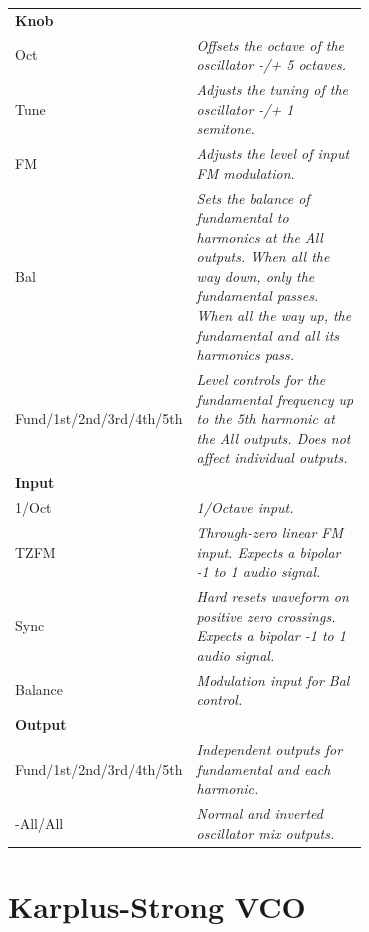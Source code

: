 \documentclass[11pt]{book}
\begin{document}
\begin{table}[ht]
\small
\sffamily
\renewcommand\arraystretch{1.5}
\centering
\begin{tabular}{l*{1}{>{\raggedright\arraybackslash}p{0.7\linewidth}}}

\toprule
\textbf{Knob} \\
Oct & \textit{Offsets the octave of the oscillator -/+ 5 octaves.} \\
Tune & \textit{Adjusts the tuning of the oscillator -/+ 1 semitone.} \\
FM & \textit{Adjusts the level of input FM modulation.} \\
Bal & \textit{Sets the balance of fundamental to harmonics at the All outputs. When all the way down, only the fundamental passes. When all the way up, the fundamental and all its harmonics pass.} \\
Fund/1st/2nd/3rd/4th/5th & \textit{Level controls for the fundamental frequency up to the 5th harmonic at the All outputs. Does not affect individual outputs.} \\

\midrule
\textbf{Input} \\
1/Oct & \textit{1/Octave input.} \\
TZFM & \textit{Through-zero linear FM input. Expects a bipolar -1 to 1 audio signal.} \\
Sync & \textit{Hard resets waveform on positive zero crossings. Expects a bipolar -1 to 1 audio signal.} \\
Balance & \textit{Modulation input for Bal control.} \\

\midrule
\textbf{Output} \\
Fund/1st/2nd/3rd/4th/5th & \textit{Independent outputs for fundamental and each harmonic.} \\
-All/All & \textit{Normal and inverted oscillator mix outputs.} \\

\bottomrule
\end{tabular}
\end{table}%

\pagebreak


\section{Karplus-Strong VCO}
\end{document}
